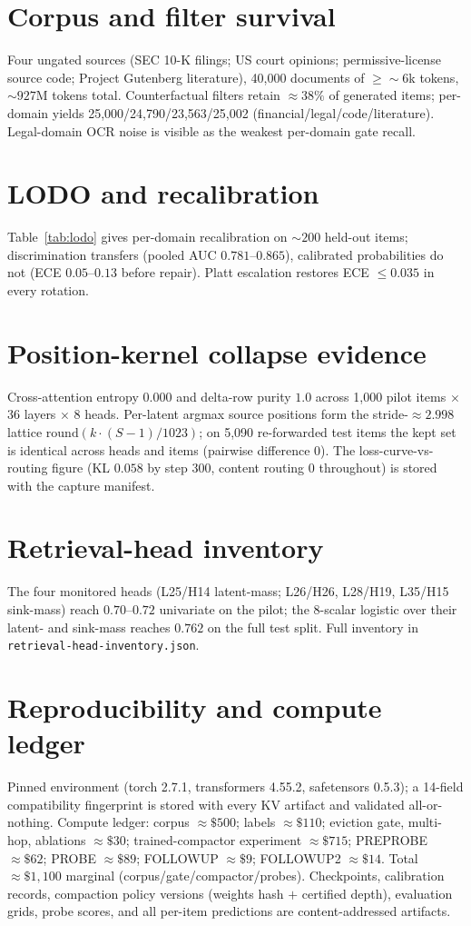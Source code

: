 \documentclass[11pt]{article}
\begin{document}
\section{Corpus and filter survival}
Four ungated sources (SEC 10-K filings; US court opinions;
permissive-license source code; Project Gutenberg literature), 40{,}000
documents of $\geq{\sim}6$k tokens, ${\sim}927$M tokens total.
Counterfactual filters retain ${\approx}38\%$ of generated items; per-domain
yields 25{,}000/24{,}790/23{,}563/25{,}002 (financial/legal/code/literature).
Legal-domain OCR noise is visible as the weakest per-domain gate recall.

\section{LODO and recalibration}
Table~\ref{tab:lodo} gives per-domain recalibration on ${\sim}200$ held-out
items; discrimination transfers (pooled AUC $0.781$--$0.865$), calibrated
probabilities do not (ECE $0.05$--$0.13$ before repair). Platt escalation
restores ECE $\leq 0.035$ in every rotation.

\section{Position-kernel collapse evidence}
\label{app:collapse}
Cross-attention entropy $0.000$ and delta-row purity $1.0$ across 1{,}000
pilot items $\times$ 36 layers $\times$ 8 heads. Per-latent argmax source
positions form the stride-${\approx}2.998$ lattice
$\mathrm{round}(k\cdot(S{-}1)/1023)$; on 5{,}090 re-forwarded test items the
kept set is identical across heads and items (pairwise difference $0$). The
loss-curve-vs-routing figure (KL $0.058$ by step 300, content routing $0$
throughout) is stored with the capture manifest.

\section{Retrieval-head inventory}
The four monitored heads (L25/H14 latent-mass; L26/H26, L28/H19, L35/H15
sink-mass) reach $0.70$--$0.72$ univariate on the pilot; the 8-scalar
logistic over their latent- and sink-mass reaches $0.762$ on the full test
split. Full inventory in \texttt{retrieval-head-inventory.json}.

\section{Reproducibility and compute ledger}
Pinned environment (torch 2.7.1, transformers 4.55.2, safetensors 0.5.3); a
14-field compatibility fingerprint is stored with every KV artifact and
validated all-or-nothing. Compute ledger: corpus ${\approx}\$500$; labels
${\approx}\$110$; eviction gate, multi-hop, ablations ${\approx}\$30$;
trained-compactor experiment ${\approx}\$715$; PREPROBE ${\approx}\$62$;
PROBE ${\approx}\$89$; FOLLOWUP ${\approx}\$9$; FOLLOWUP2 ${\approx}\$14$.
Total ${\approx}\$1{,}100$ marginal (corpus/gate/compactor/probes). Checkpoints, calibration records,
compaction policy versions (weights hash $+$ certified depth), evaluation
grids, probe scores, and all per-item predictions are content-addressed
artifacts.
\end{document}
